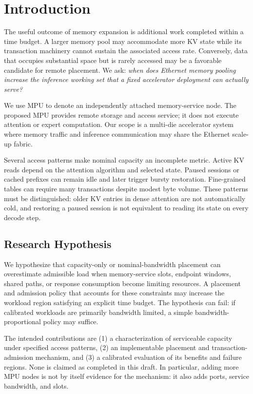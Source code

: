 \section{Introduction}
The useful outcome of memory expansion is additional work completed
within a time budget. A larger memory pool may accommodate more KV state
while its transaction machinery cannot sustain the associated access
rate. Conversely, data that occupies substantial space but is rarely
accessed may be a favorable candidate for remote placement. We ask:
\emph{when does Ethernet memory pooling increase the inference working set
that a fixed accelerator deployment can actually serve?}

We use MPU to denote an independently attached memory-service node.
The proposed MPU provides remote storage and access service; it does not
execute attention or expert computation. Our scope is a multi-die
accelerator system where memory traffic and inference communication may
share the Ethernet scale-up fabric.

Several access patterns make nominal capacity an incomplete metric.
Active KV reads depend on the attention algorithm and selected state.
Paused sessions or cached prefixes can remain idle and later trigger
bursty restoration. Fine-grained tables can require many transactions
despite modest byte volume. These patterns must be distinguished:
older KV entries in dense attention are not automatically cold, and
restoring a paused session is not equivalent to reading its state on
every decode step.

\subsection{Research Hypothesis}
We hypothesize that capacity-only or nominal-bandwidth placement can
overestimate admissible load when memory-service slots, endpoint windows,
shared paths, or response consumption become limiting resources. A
placement and admission policy that accounts for these constraints may
increase the workload region satisfying an explicit time budget. The
hypothesis can fail: if calibrated workloads are primarily bandwidth
limited, a simple bandwidth-proportional policy may suffice.

The intended contributions are (1) a characterization of serviceable
capacity under specified access patterns, (2) an implementable placement
and transaction-admission mechanism, and (3) a calibrated evaluation of
its benefits and failure regions. None is claimed as completed in this
draft. In particular, adding more MPU nodes is not by itself evidence
for the mechanism: it also adds ports, service bandwidth, and slots.

